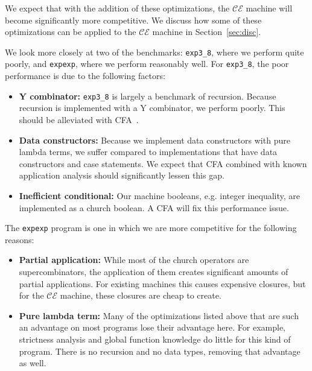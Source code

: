 We expect that with the addition of these optimizations, the $\mathcal{CE}$
machine will become significantly more competitive. We discuss how some of these
optimizations can be applied to the $\mathcal{CE}$ machine in
Section~\ref{sec:disc}.

We look more closely at two of the benchmarks: \texttt{exp3\_8}, where we perform
quite poorly, and \texttt{expexp}, where we perform reasonably well. For
\texttt{exp3\_8}, the poor performance is due to the following factors: 

\begin{itemize}
\item \textbf{Y combinator:} \texttt{exp3\_8} is largely a benchmark of recursion.
Because recursion is implemented with a Y combinator, we perform poorly. This
should be alleviated with CFA~\cite{rozas1992taming}. 
\item \textbf{Data constructors:} Because we implement data constructors with
pure lambda terms, we suffer compared to implementations that have data
constructors and case statements. We expect that CFA combined with known
application analysis should significantly lessen this gap.
\item \textbf{Inefficient conditional:} Our machine booleans, e.g. integer
inequality, are implemented as a church boolean. A CFA will fix this performance
issue.
\end{itemize}

The \texttt{expexp} program is one in which we are more competitive for the following reasons:
\begin{itemize}
\item \textbf{Partial application:} While most of the church operators are
supercombinators, the application of them creates significant amounts of partial
applications. For existing machines this causes expensive closures, but for the
$\mathcal{CE}$ machine, these closures are cheap to create.  
\item \textbf{Pure lambda term:} Many of the optimizations listed above that
are such an advantage on most programs lose their advantage here. For example,
strictness analysis and global function knowledge do little for this kind of
program. There is no recursion and no data types, removing that advantage as
well. 
\end{itemize}


